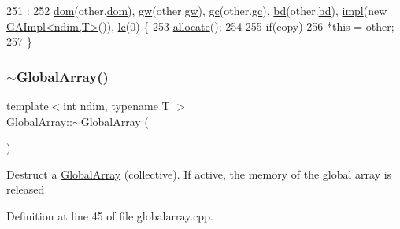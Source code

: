 \begin{DoxyCode}
251                                                                            :
252   \hyperlink{classshark_1_1ndim_1_1_global_array_a412e192f4c7a15888da625ae833e8d3e}{dom}(other.\hyperlink{classshark_1_1ndim_1_1_global_array_a412e192f4c7a15888da625ae833e8d3e}{dom}), \hyperlink{classshark_1_1ndim_1_1_global_array_a38d93d114d585e5e5491c5ecd35c6bfc}{gw}(other.\hyperlink{classshark_1_1ndim_1_1_global_array_a38d93d114d585e5e5491c5ecd35c6bfc}{gw}), \hyperlink{classshark_1_1ndim_1_1_global_array_a100f4d523420deffde330079df7501e2}{gc}(other.\hyperlink{classshark_1_1ndim_1_1_global_array_a100f4d523420deffde330079df7501e2}{gc}), \hyperlink{classshark_1_1ndim_1_1_global_array_aead89700a3d1d960432c6dc971251a9c}{bd}(other.\hyperlink{classshark_1_1ndim_1_1_global_array_aead89700a3d1d960432c6dc971251a9c}{bd}), 
      \hyperlink{classshark_1_1ndim_1_1_global_array_a70684121da4badfef791c15d7076282f}{impl}(\textcolor{keyword}{new} \hyperlink{classshark_1_1ndim_1_1_g_a_impl}{GAImpl<ndim,T>}()), \hyperlink{classshark_1_1ndim_1_1_global_array_a8248f4bd6e1f48d25148dd6d5288cb4c}{lc}(0) \{
253     \hyperlink{classshark_1_1ndim_1_1_global_array_ad7054741564c962156640415d208dc72}{allocate}();
254 
255     \textcolor{keywordflow}{if}(copy)
256         *\textcolor{keyword}{this} = other;
257 \}
\end{DoxyCode}
\hypertarget{classshark_1_1ndim_1_1_global_array_acd71722990795db5e20aefc9e5545add}{}\label{classshark_1_1ndim_1_1_global_array_acd71722990795db5e20aefc9e5545add} 
\subsubsection{\texorpdfstring{$\sim$\+Global\+Array()}{~GlobalArray()}}
{\footnotesize\ttfamily template$<$int ndim, typename T $>$ \\
Global\+Array\+::$\sim$\+Global\+Array (\begin{DoxyParamCaption}{ }\end{DoxyParamCaption})}

Destruct a \hyperlink{classshark_1_1ndim_1_1_global_array}{Global\+Array} (collective). If active, the memory of the global array is released 

Definition at line 45 of file globalarray.\+cpp.


